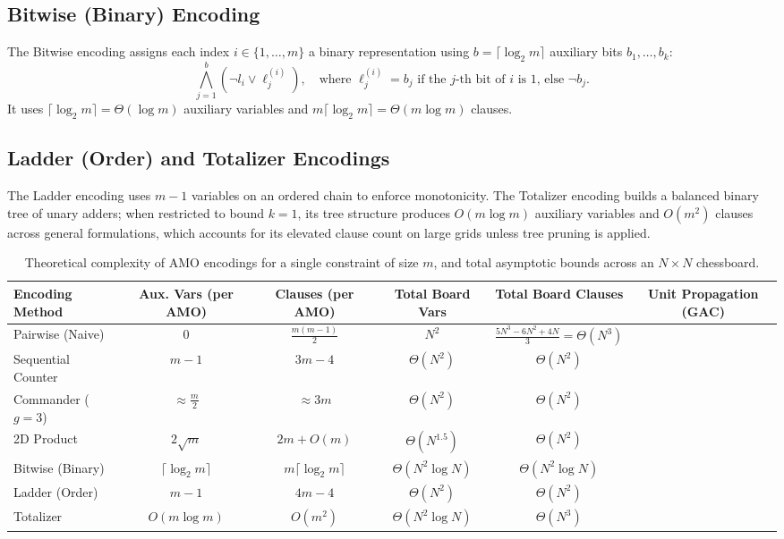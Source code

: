 \documentclass[a4paper,fleqn]{cas-sc}
\newcommand{\cmark}{\ding{51}}
\begin{document}
\subsection{Bitwise (Binary) Encoding}
The Bitwise encoding \citep{frisch2005symmetry} assigns each index $i \in \{1, \dots, m\}$ a binary representation using $b = \lceil \log_2 m \rceil$ auxiliary bits $b_1, \dots, b_k$:
\begin{equation}
    \bigwedge_{j=1}^b (\neg l_i \lor \ell_{j}^{(i)}), \quad \text{where } \ell_{j}^{(i)} = b_j \text{ if the } j\text{-th bit of } i \text{ is 1, else } \neg b_j.
\end{equation}
It uses $\lceil \log_2 m \rceil = \Theta(\log m)$ auxiliary variables and $m \lceil \log_2 m \rceil = \Theta(m \log m)$ clauses.

\subsection{Ladder (Order) and Totalizer Encodings}
The Ladder encoding \citep{gent2004ladder} uses $m-1$ variables on an ordered chain to enforce monotonicity. The Totalizer encoding \citep{bailleux2003totalizer} builds a balanced binary tree of unary adders; when restricted to bound $k = 1$, its tree structure produces $O(m \log m)$ auxiliary variables and $O(m^2)$ clauses across general formulations, which accounts for its elevated clause count on large grids unless tree pruning is applied.

\begin{table}[t]
\centering
\caption{Theoretical complexity of AMO encodings for a single constraint of size $m$, and total asymptotic bounds across an $N \times N$ chessboard.}
\label{tab:theoretical_complexity}
\small
\begin{tabular*}{\textwidth}{lccccc}
\toprule
\textbf{Encoding Method} & \textbf{Aux. Vars (per AMO)} & \textbf{Clauses (per AMO)} & \textbf{Total Board Vars} & \textbf{Total Board Clauses} & \textbf{Unit Propagation (GAC)} \\
\midrule
Pairwise (Naive) & $0$ & $\frac{m(m-1)}{2}$ & $N^2$ & $\frac{5N^3 - 6N^2 + 4N}{3} = \Theta(N^3)$ & \cmark \\
Sequential Counter \citep{sinz2005towards} & $m - 1$ & $3m - 4$ & $\Theta(N^2)$ & $\Theta(N^2)$ & \cmark \\
Commander ($g=3$) \citep{klieber2007commander} & $\approx \frac{m}{2}$ & $\approx 3m$ & $\Theta(N^2)$ & $\Theta(N^2)$ & \cmark \\
2D Product \citep{chen2010product} & $2\sqrt{m}$ & $2m + O(m)$ & $\Theta(N^{1.5})$ & $\Theta(N^2)$ & \cmark \\
Bitwise (Binary) \citep{frisch2005symmetry} & $\lceil \log_2 m \rceil$ & $m \lceil \log_2 m \rceil$ & $\Theta(N^2 \log N)$ & $\Theta(N^2 \log N)$ & \cmark \\
Ladder (Order) \citep{gent2004ladder} & $m - 1$ & $4m - 4$ & $\Theta(N^2)$ & $\Theta(N^2)$ & \cmark \\
Totalizer \citep{bailleux2003totalizer} & $O(m \log m)$ & $O(m^2)$ & $\Theta(N^2 \log N)$ & $\Theta(N^3)$ & \cmark \\
\bottomrule
\end{tabular*}
\end{table}
\end{document}
